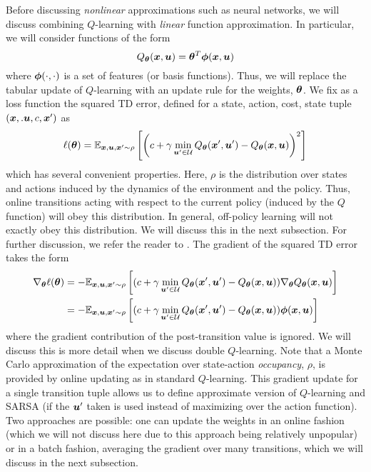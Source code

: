 Before discussing \textit{nonlinear} approximations such as neural networks, we will discuss combining $Q$-learning with \textit{linear} function approximation. In particular, we will consider functions of the form
\begin{equation}
    Q_{\bm{\theta}}(\bm{x},\bm{u}) = \bm{\theta}^T \bm{\phi}(\bm{x},\bm{u})
\end{equation}
where $\bm{\phi}(\cdot, \cdot)$ is a set of features (or basis functions). Thus, we will replace the tabular update of $Q$-learning with an update rule for the weights, $\bm{\theta}$. We fix as a loss function the squared TD error, defined for a state, action, cost, state tuple $(\bm{x},. \bm{u}, c, \bm{x}')$ as 
\begin{equation}
    \ell(\bm{\theta}) = \mathbb{E}_{\bm{x},\bm{u},\bm{x}'\sim \rho}\left[ \left(c + \gamma \min_{\bm{u}' \in \mathcal{U}} Q_{\bm{\theta}}(\bm{x}',\bm{u}') - Q_{\bm{\theta}}(\bm{x},\bm{u})\right)^2\right]
\end{equation}
which has several convenient properties. Here, $\rho$ is the distribution over states and actions induced by the dynamics of the environment and the policy. Thus, online transitions acting with respect to the current policy (induced by the $Q$ function) will obey this distribution. In general, off-policy learning will not exactly obey this distribution. We will discuss this in the next subsection. For further discussion, we refer the reader to \cite{sutton2018reinforcement}. The gradient of the squared TD error takes the form
\begin{align}
    \nabla_{\bm{\theta}} \ell(\bm{\theta}) &= - \mathbb{E}_{\bm{x},\bm{u},\bm{x}'\sim \rho}\left[  (c + \gamma \min_{\bm{u}' \in \mathcal{U}} Q_{\bm{\theta}}(\bm{x}',\bm{u}') - Q_{\bm{\theta}}(\bm{x},\bm{u})) \nabla_{\bm{\theta}} Q_{\bm{\theta}}(\bm{x},\bm{u}) \right]\\
    &= - \mathbb{E}_{\bm{x},\bm{u},\bm{x}'\sim \rho}\left[  (c + \gamma \min_{\bm{u}' \in \mathcal{U}} Q_{\bm{\theta}}(\bm{x}',\bm{u}') - Q_{\bm{\theta}}(\bm{x},\bm{u})) \bm{\phi}(\bm{x},\bm{u})\right]
\end{align}
where the gradient contribution of the post-transition value is ignored. We will discuss this is more detail when we discuss double $Q$-learning. Note that a Monte Carlo approximation of the expectation over state-action \textit{occupancy}, $\rho$, is provided by online updating as in standard $Q$-learning. This gradient update for a single transition tuple allows us to define approximate version of $Q$-learning and SARSA (if the $\bm{u}'$ taken is used instead of maximizing over the action function). Two approaches are possible: one can update the weights in an online fashion (which we will not discuss here due to this approach being relatively unpopular) or in a batch fashion, averaging the gradient over many transitions, which we will discuss in the next subsection. 

